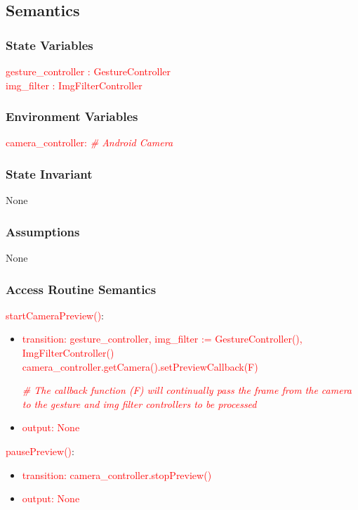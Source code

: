 \documentclass[12pt, titlepage]{article}
\begin{document}
\subsection* {Semantics}

\subsubsection* {State Variables}

\textcolor{red}{gesture\_controller : GestureController\\
img\_filter : ImgFilterController
}
\subsubsection* {Environment Variables}

\textcolor{red}{camera\_controller: \textit{\# Android Camera}}

\subsubsection* {State Invariant}

None

\subsubsection* {Assumptions}

None

\subsubsection* {Access Routine Semantics}


\textcolor{red}{startCameraPreview()}: 
\begin{itemize}
\item \textcolor{red}{transition: gesture\_controller, img\_filter := GestureController(), ImgFilterController() \\
        camera\_controller.getCamera().setPreviewCallback(F) 
        }
        
        \textcolor{red}{\textit{\# The callback function (F) will continually pass the frame from the camera to the gesture and img filter controllers to be processed}}
\item \textcolor{red}{output: None}

\end{itemize}

\noindent \textcolor{red}{pausePreview()}:
\begin{itemize}
\item \textcolor{red}{transition: camera\_controller.stopPreview()}
\item \textcolor{red}{output: None}

\end{itemize}
\end{document}
